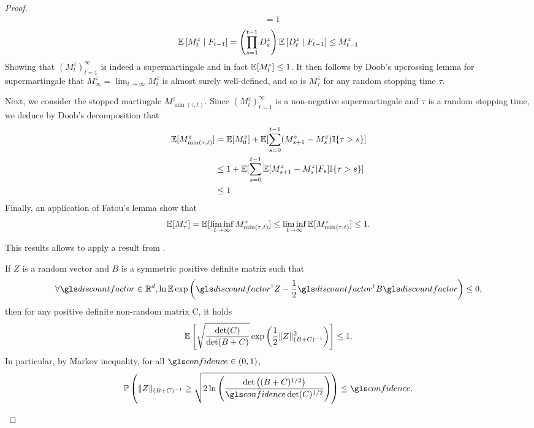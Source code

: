 \begin{subappendices}
\begin{proof}
\begin{align*}
		&= 1
		\end{align*}
		\begin{align*}
		\operatorname*{\mathbb{E}}\left[M_t^z \;\middle|\; F_{t-1}\right] = \left(\prod_{s=1}^{t-1} D_s^z\right) \operatorname*{\mathbb{E}}\left[D_t^z \;\middle|\; F_{t-1}\right] \leq M_{t-1}^z
		\end{align*}
		Showing that $(M_t^z)_{t=1}^\infty$ is indeed a supermartingale and in fact $\operatorname*{\mathbb{E}}[M_t^z]\leq 1$.
		It then follows by Doob's upcrossing lemma for supermartingale that $M_\infty^z = \lim_{t\to\infty} M_t^z$ is almost surely well-defined, and so is $M_\tau^z$ for any random stopping time $\tau$.
		
		Next, we consider the stopped martingale $M_{\min(\tau,t)}^z$. Since 
		$(M_t^z)_{t=1}^\infty$ is a non-negative supermartingale and $\tau$ is a random stopping time, we deduce by Doob's decomposition that
		\begin{align*}
		\operatorname*{\mathbb{E}}[M_{\min(\tau,t)}^z] &= \operatorname*{\mathbb{E}}[M_0^z] + \operatorname*{\mathbb{E}}[\sum_{s=0}^{t-1} (M_{s+1}^z-M_s^z) \mathbb{I}\{\tau>s\}]\\
		&\leq 1 + \operatorname*{\mathbb{E}}[\sum_{s=0}^{t-1} \operatorname*{\mathbb{E}}[M_{s+1}^z-M_s^z|F_{s}] \mathbb{I}\{\tau>s\}]\\
		&\leq 1
		\end{align*}
		Finally, an application of Fatou's lemma show that 
		$$\operatorname*{\mathbb{E}}[M_\tau^z] = \operatorname*{\mathbb{E}}[\liminf_{t\to\infty} M_{\min(\tau,t)}^z] \leq \liminf_{t\to\infty} \operatorname*{\mathbb{E}}[M_{\min(\tau,t)}^z] \leq 1.$$
		
		This results allows to apply a result from \citep{pena2008self}.
		\begin{lemma}
			\begin{leftbar}[lemmabar]
			If $Z$ is a random vector and $B$ is a symmetric positive definite matrix such that
			\[\forall \discount\in\Real^d, \ln \expectedvalue \exp \left(\discount^\transp Z -\frac{1}{2} \discount^\transp B \discount \right)\leq 0,\]
			then for any positive definite non-random matrix C, it holds
			\[\operatorname*{\mathbb{E}}\left[ \sqrt{\frac{\det(C)}{\det(B+C)} } \exp\left( \frac{1}{2}\|Z\|^2_{(B+C)^{-1}}\right)\right]\leq 1. \] 
			In particular, by Markov inequality, for all $\confidence\in(0,1)$, 
			\[\probability{\|Z\|_{(B+C)^{-1}} \geq \sqrt{2\ln \left(\frac{\det \left((B+C)^{1/2}\right)}{\confidence\det(C)^{1/2}}\right)}}\leq \confidence.\]
			\end{leftbar}
		\end{lemma}
		

\end{proof}
\end{subappendices}
